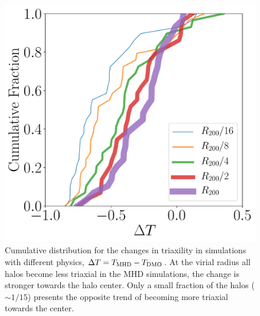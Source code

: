 \documentclass[usenatbib]{mnras}
\begin{document}
\begin{figure}
\includegraphics[width=0.9\columnwidth]{delta_triaxiality_distro.pdf}
\caption{
  Cumulative distribution for the changes in triaxility in simulations
  with different physics, $\Delta T=T_{\rm MHD}-T_{\rm DMO}$.
  At the virial radius all halos become less triaxial in the MHD
  simulations, the change is stronger towards the halo center.
  Only a small fraction of the halos ($\sim 1/15$) presents the
  opposite trend of becoming more triaxial towards the center.}
\label{fig:delta_triaxial_cumulative}
\end{figure}
\end{document}
